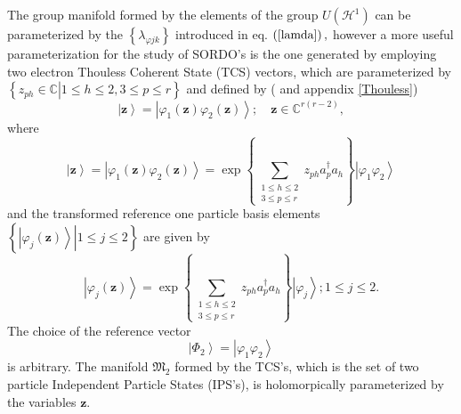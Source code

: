 \documentclass[aps,preprint]{revtex4}%
\begin{document}
The group manifold formed by the elements of the group $U\left(
\mathcal{H}^{1}\right)  $ can be parameterized by the $\left\{  \lambda
_{\varphi jk}\right\}  $ introduced in eq. $\left(  \ref{lamda}\right)  ,$
however a more useful parameterization for the study of SORDO's is the one
generated by employing two electron Thouless Coherent State (TCS) vectors,
which are parameterized by $\left\{  \left.  z_{ph}\in\mathbb{C}\right\vert
1\leq h\leq2,3\leq p\leq r\right\}  $ and defined by ( \cite{weiner}%
\cite{Orhn}\cite{Thouless}\cite{Peremilov} and appendix \ref{Thouless})
\begin{equation}
\left\vert \mathbf{z}\right\rangle =\left\vert \varphi_{1}\left(
\mathbf{z}\right)  \varphi_{2}\left(  \mathbf{z}\right)  \right\rangle
;\quad\mathbf{z\in}\mathbb{C}^{r\left(  r-2\right)  },
\end{equation}
where
\begin{equation}
\left\vert \mathbf{z}\right\rangle =\left\vert \varphi_{1}\left(
\mathbf{z}\right)  \varphi_{2}\left(  \mathbf{z}\right)  \right\rangle
=\exp\left\{  \sum\limits_{\substack{1\leq h\leq2\\3\leq p\leq r}}z_{ph}%
a_{p}^{\dagger}a_{h}\right\}  \left\vert \varphi_{1}\varphi_{2}\right\rangle
\label{CS}%
\end{equation}
and the transformed reference one particle basis elements $\left\{  \left.
\left\vert \varphi_{j}\left(  \mathbf{z}\right)  \right\rangle \right\vert
1\leq j\leq2\right\}  $ are given by
\begin{equation}
\left\vert \varphi_{j}\left(  \mathbf{z}\right)  \right\rangle =\exp\left\{
\sum\limits_{\substack{1\leq h\leq2\\3\leq p\leq r}}z_{ph}a_{p}^{\dagger}%
a_{h}\right\}  \left\vert \varphi_{j}\right\rangle ;1\leq j\leq2.
\end{equation}
The choice of the reference vector%
\begin{equation}
\left\vert \Phi_{2}\right\rangle =\left\vert \varphi_{1}\varphi_{2}%
\right\rangle
\end{equation}
is arbitrary. The manifold $\mathfrak{M}_{2}$ formed by the TCS's, which is
the set of two particle Independent Particle States (IPS's), is holomorpically
parameterized by the variables $\mathbf{z.}$
\end{document}
